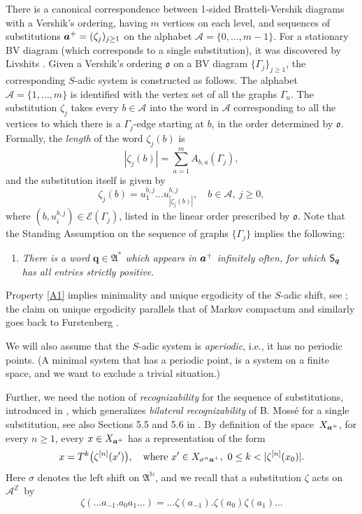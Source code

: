 \documentclass[11pt]{article}
\newcommand{\ie}{i.e.,\xspace}
\numberwithin{equation}{section}\newcommand{\Relation}[2][]{}\newtheorem*{prop*}{Proposition}
\let\mathcal\mathscr
\theoremstyle{plain}
\theoremstyle{definition}
\newcommand\bq{{\boldsymbol q}}
\let\Gam\Gamma
\let\sig\sigma
\newcommand\ok{\mathfrak{o}}
\newcommand\FrA{\mathfrak{A}}
\newcommand\Ak{\mathcal{A}}
\newcommand\A{\mathcal{A}}
\newcommand{\Ek}{\mathcal{E}}
\newcommand{\Z}{\mathbb{Z}}
\newcommand{\N}{\mathbb{N}}
\newcommand\Sf{{\sf S}}
\newcommand\be{\begin{equation}}
\newcommand\ee{\end{equation}}
\begin{document}
There is a canonical correspondence between 1-sided Bratteli-Vershik diagrams with a Vershik's ordering, having $m$ vertices on each level, and sequences of substitutions ${\boldsymbol a}^+=(\zeta_j)_{j\ge 1}$ on the alphabet
$\Ak = \{0,\ldots,m-1\}$. For a stationary BV diagram (which corresponds to a single substitution), it was discovered by Livshits \cite{Liv1}.
Given a Vershik's ordering $\ok$ on a BV diagram
$\{\Gam_{j}\}_{j\ge 1}$, the corresponding $S$-adic system is constructed as follows. The
alphabet $\Ak = \{1,\ldots,m\}$ is identified with the vertex set of all the graphs $\Gam_n$.
The substitution $\zeta_j$ takes every $b\in \A$ into the word in $\A$ corresponding to all the vertices to which
there is a $\Gam_{j}$-edge starting at $b$, in the order determined by $\ok$. Formally, the \emph{length} of the word $\zeta_j(b)$ is
\[
|\zeta_j(b)| = \sum_{a=1}^m A_{b,a}(\Gam_j),
\]
and the substitution itself is given by
\be \label{def-subs1}
\zeta_j(b) =u_1^{b,j}\dots u_{|\zeta_j(b)|}^{b,j},\quad b\in \A,\ j\ge 0,
\ee
where $(b, u_i^{b,j})\in \Ek(\Gam_j)$, listed in the linear order prescribed by $\ok$. Note that the Standing Assumption on the sequence of graphs $\{\Gam_j\}$ implies the following:
\begin{enumerate}\renewcommand{\theenumi}{A\arabic{enumi}}
\item\label{A1}
\emph{There is a word $\bq\in \FrA^*$ which appears in ${\boldsymbol a}^+$ infinitely often, for which $\Sf_\bq$ has all entries strictly positive.}
\end{enumerate}

Property \eqref{A1} implies minimality and unique ergodicity of the $S$-adic shift, see \hbox{\cite[Th.\,5.2 \& 5.7]{BD}}; the claim on unique ergodicity parallels that of Markov compactum and similarly goes back to Furstenberg \cite[(16.13)]{furst}.

We will also assume that the $S$-adic system is \emph{aperiodic}, \ie it has no periodic points. (A minimal system that has a periodic point, is a system on a finite space, and we want to exclude a trivial situation.)

Further, we need the notion of \emph{recognizability} for the sequence of substitutions, introduced
in \cite{BSTY}, which generalizes \emph{bilateral recognizability} of B. Mossé \cite{Mosse} for a single substitution, see also Sections 5.5 and 5.6 in \cite{Queff}. By definition of the space~$X_{{\boldsymbol a}^+}$, for every $n\ge 1$, every $x\in X_{{\boldsymbol a}^+}$ has a representation of the form
\be \label{recog}
x = T^k\bigl(\zeta^{[n]}(x')\bigr),\quad \text{where } x'\in X_{\sig^n \ba^+},\ 0\le k < |\zeta^{[n]}(x_0)|.
\ee
Here $\sig$ denotes the left shift on $\FrA^\N$, and we recall that a substitution $\zeta$ acts on~$\Ak^\Z$~by
\[
\zeta(\ldots a_{-1}.a_0 a_1\ldots) = \ldots \zeta(a_{-1}).\zeta(a_0)\zeta(a_1)\ldots
\]
\end{document}

